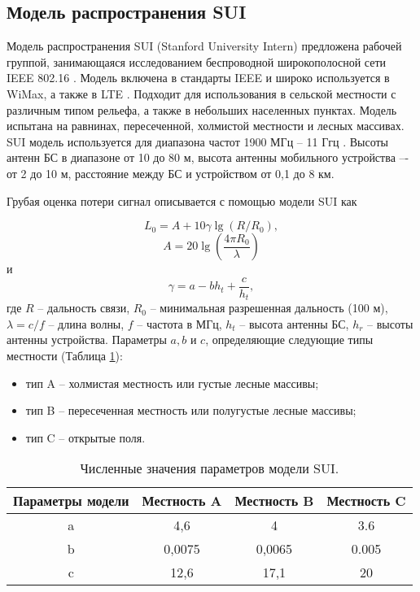 \subsection{Модель распространения SUI}

Модель распространения SUI (Stanford University Intern) предложена рабочей группой, занимающаяся исследованием беспроводной широкополосной сети IEEE 802.16 \cite{Mollel2014}. Модель включена в стандарты IEEE и широко используется в WiMax, а также в LTE \cite{Zreikat2017}. Подходит для использования в сельской местности с различным типом рельефа, а также в небольших населенных пунктах. Модель испытана на равнинах, пересеченной, холмистой местности и лесных массивах. SUI модель используется для диапазона частот 1900 МГц -- 11 Ггц \cite{Cabuk2020}. Высоты антенн БС в диапазоне от 10 до 80 м, высота антенны мобильного устройства –- от 2 до 10 м, расстояние между БС и устройством от 0,1 до 8 км.

Грубая оценка потери сигнал описывается с помощью модели SUI как

\begin{equation}
  \label{eq:part1_sui_l0}
  L_0 = A + 10\gamma\lg{(R/R_0)},
\end{equation}
$$
A = 20\lg{(\frac{4\pi R_0 }{\lambda})}
$$
и
$$
\gamma = a - b h_t + \frac{c}{h_t}, 
$$
где $R$ -- дальность связи, $R_0$ -- минимальная разрешенная дальность (100 м), $\lambda = c / f$ -- длина волны, $f$ -- частота в МГц, $h_t$ -- высота антенны БС, $h_r$ -- высоты антенны устройства. Параметры $a, b$ и $c$, определяющие следующие типы местности (Таблица \cref{tab:part1_abc_sui_model}):
\begin{itemize}
  \item тип A -- холмистая местность или густые лесные массивы;
  \item тип B -- пересеченная местность или полугустые лесные массивы;
  \item тип C -- открытые поля.
\end{itemize}


\begin{longtable}[c]{| c | c | c | c |}
  \caption{Численные значения параметров модели SUI.}\label{tab:part1_abc_sui_model}\\

  \hline
  \textbf{Параметры модели} & \textbf{Местность A} & \textbf{Местность B} &  \textbf{Местность C}\\ \hline
  a & 4,6 & 4 & 3.6 \\
  b & 0,0075 & 0,0065 & 0.005 \\
  c & 12,6 & 17,1 &20 \\
  \hline
  \hline
\end{longtable}




